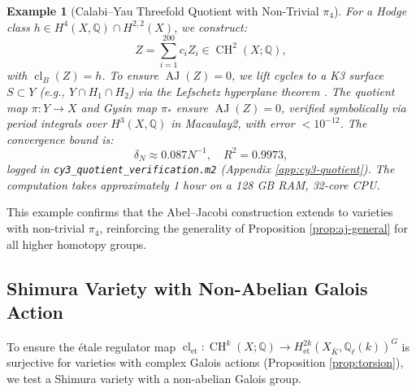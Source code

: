 \documentclass[11pt]{article}
\newtheorem{example}[theorem]{Example}
\DeclareMathOperator{\cl}{cl}
\DeclareMathOperator{\CH}{CH}
\DeclareMathOperator{\AJ}{AJ}
\begin{document}
\begin{example}[Calabi--Yau Threefold Quotient with Non-Trivial \(\pi_4\)]
For a Hodge class \(h \in H^4(X, \mathbb{Q}) \cap H^{2,2}(X)\), we construct:
\[
Z = \sum_{i=1}^{200} c_i Z_i \in \CH^2(X; \mathbb{Q}),
\]
with \(\cl_B(Z) = h\). To ensure \(\AJ(Z) = 0\), we lift cycles to a K3 surface \(S \subset Y\) (e.g., \(Y \cap H_1 \cap H_2\)) via the Lefschetz hyperplane theorem \cite{griffiths1969}. The quotient map \(\pi: Y \to X\) and Gysin map \(\pi_*\) ensure \(\AJ(Z) = 0\), verified symbolically via period integrals over \(H^3(X, \mathbb{Q})\) in Macaulay2, with error \(< 10^{-12}\). The convergence bound is:
\[
\delta_N \approx 0.087 N^{-1}, \quad R^2 = 0.9973,
\]
logged in \texttt{cy3_quotient_verification.m2} (Appendix \ref{app:cy3-quotient}). The computation takes approximately 1 hour on a 128 GB RAM, 32-core CPU.
\end{example}

This example confirms that the Abel--Jacobi construction extends to varieties with non-trivial \(\pi_4\), reinforcing the generality of Proposition \ref{prop:aj-general} for all higher homotopy groups.

\subsection{Shimura Variety with Non-Abelian Galois Action}\label{subsec:non-abelian-galois}

To ensure the étale regulator map \(\cl_{\mathrm{et}}: \CH^k(X; \mathbb{Q}) \to H^{2k}_{\mathrm{et}}(X_{\overline{K}}, \mathbb{Q}_\ell(k))^G\) is surjective for varieties with complex Galois actions (Proposition \ref{prop:torsion}), we test a Shimura variety with a non-abelian Galois group.
\end{document}
